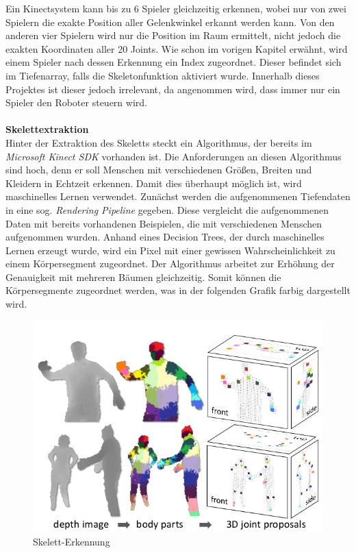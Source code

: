 Ein Kinectsystem kann bis zu 6 Spieler gleichzeitig erkennen, wobei nur von zwei Spielern die exakte Position aller Gelenkwinkel erkannt werden kann. Von den anderen vier Spielern wird nur die Position im Raum ermittelt, nicht jedoch die exakten Koordinaten aller 20 Joints. Wie schon im vorigen Kapitel erwähnt, wird einem Spieler nach dessen Erkennung ein Index zugeordnet. Dieser befindet sich im Tiefenarray, falls die Skeletonfunktion aktiviert wurde. Innerhalb dieses Projektes ist dieser jedoch irrelevant, da angenommen wird, dass immer nur ein Spieler
den Roboter steuern wird.\\ \\
\noindent
\textbf{Skelettextraktion}\\
Hinter der Extraktion des Skeletts steckt ein Algorithmus, der bereits im \textit{Microsoft Kinect SDK} vorhanden ist. 
Die Anforderungen an diesen Algorithmus sind hoch, denn er soll Menschen mit verschiedenen Größen,
Breiten und Kleidern in Echtzeit erkennen.
Damit dies überhaupt möglich ist, wird maschinelles Lernen verwendet. Zunächst werden die aufgenommenen Tiefendaten in eine sog. \textit{Rendering Pipeline}\cite{pdf:realtime_human_pose} gegeben. Diese vergleicht die aufgenommenen Daten mit bereits
vorhandenen Beispielen, die mit verschiedenen Menschen aufgenommen wurden. Anhand eines Decision Trees, der durch maschinelles Lernen erzeugt wurde, wird ein Pixel mit einer gewissen Wahrscheinlichkeit zu einem Körpersegment zugeordnet. Der Algorithmus arbeitet zur Erhöhung der Genauigkeit mit mehreren Bäumen gleichzeitig. Somit können die Körpersegmente zugeordnet werden, was in der folgenden Grafik farbig dargestellt wird.

\begin{figure}[H]						
	\centering							
	\includegraphics[scale=0.5]{Bilder/kinect_body_parts.png}			
	\caption{Skelett-Erkennung \cite{pdf:realtime_human_pose}}						
	\label{f:kinect_skeleton}						
\end{figure}

